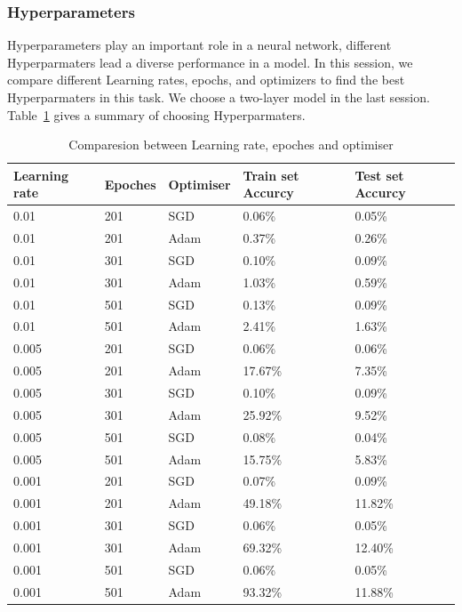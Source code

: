 \documentclass[runningheads]{llncs}
\begin{document}
\subsubsection{Hyperparameters}
Hyperparameters play an important role in a neural network, different Hyperparmaters lead a diverse performance in a model. In this session, we compare different Learning rates, epochs, and optimizers to find the best Hyperparmaters in this task. We choose a two-layer model in the last session. Table~\ref{tab2} gives a summary of choosing Hyperparmaters. 

\begin{table}
	\caption{Comparesion between Learning rate, epoches and optimiser}\label{tab2}
	\begin{center}
		\begin{tabular}{|l|l|l|l|l|}
			\hline
			Learning rate & Epoches & Optimiser & Train set Accurcy & Test set Accurcy\\
			\hline
			0.01  & 201 & SGD  & 0.06\%  & 0.05\%\\
			0.01  & 201 & Adam & 0.37\%  & 0.26\%\\
			0.01  & 301 & SGD  & 0.10\%  & 0.09\%\\
			0.01  & 301 & Adam & 1.03\%  & 0.59\%\\
			0.01  & 501 & SGD  & 0.13\%  & 0.09\%\\
			0.01  & 501 & Adam & 2.41\%  & 1.63\%\\
			\hline
			0.005 & 201 & SGD  & 0.06\%  & 0.06\%\\
			0.005 & 201 & Adam & 17.67\%  & 7.35\%\\
			0.005 & 301 & SGD  & 0.10\%  & 0.09\%\\
			0.005 & 301 & Adam & 25.92\%  & 9.52\%\\
			0.005 & 501 & SGD  & 0.08\%  & 0.04\%\\
			0.005 & 501 & Adam & 15.75\%  & 5.83\%\\
			\hline
			0.001 & 201 & SGD  & 0.07\%  & 0.09\%\\
			0.001 & 201 & Adam & 49.18\%  & 11.82\%\\
			0.001 & 301 & SGD  & 0.06\%  & 0.05\%\\
			0.001 & 301 & Adam & 69.32\%  & 12.40\%\\
			0.001 & 501 & SGD  & 0.06\%  & 0.05\%\\
			0.001 & 501 & Adam & 93.32\%  & 11.88\%\\
			\hline
		\end{tabular}
	\end{center}
\end{table}
\end{document}
